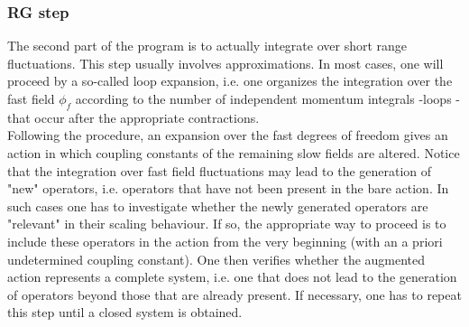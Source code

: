 \subsubsection{RG step}
The second part of the program is to actually integrate over short range fluctuations. This step usually involves approximations. 
In most cases, one will proceed by a so-called loop expansion, i.e. one organizes the integration over the fast field $\phi_f$ according to the number of independent momentum integrals -loops - that occur after the appropriate contractions.
\\
Following the procedure, an expansion over the fast degrees of freedom gives an action in which coupling constants of the remaining slow fields are altered. 
Notice that the integration over fast field fluctuations may  lead to the generation of "new" operators, i.e. operators that have not been present in the bare action. In such cases one has to investigate whether the newly generated operators are "relevant" in their scaling behaviour. 
If so, the appropriate way to proceed is to include these operators in the action from the very beginning (with an a priori undetermined coupling constant). One then verifies whether the augmented action represents a complete system, i.e. one that does not lead to the generation of operators beyond those that are already present. If necessary, one has to repeat this step until a closed system is obtained.

